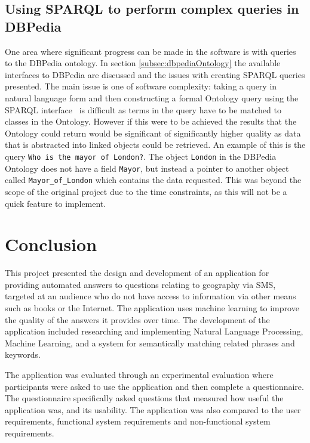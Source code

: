 \documentclass[authoryearcitations]{UoYCSproject}
\begin{document}
\section{Using SPARQL to perform complex queries in DBPedia}
\label{sec:evalSparql}
One area where significant progress can be made in the software is with queries to the DBPedia ontology. In section \ref{subsec:dbpediaOntology} the available interfaces to DBPedia are discussed and the issues with creating SPARQL queries presented. The main issue is one of software complexity: taking a query in natural language form and then constructing a formal Ontology query using the SPARQL interface~\cite{dbPediaSparql} is difficult as terms in the query have to be matched to classes in the Ontology. However if this were to be achieved the results that the Ontology could return would be significant of significantly higher quality as data that is abstracted into linked objects could be retrieved. An example of this is the query \texttt{Who is the mayor of London?}. The object \texttt{London} in the DBPedia Ontology does not have a field \texttt{Mayor}, but instead a pointer to another object called \texttt{Mayor\_of\_London} which contains the data requested. This was beyond the scope of the original project due to the time constraints, as this will not be a quick feature to implement.

\newpage

\chapter{Conclusion}
\label{sec:conclusion}
This project presented the design and development of an application for providing automated answers to questions relating to geography via SMS, targeted at an audience who do not have access to information via other means such as books or the Internet. The application uses machine learning to improve the quality of the answers it provides over time. The development of the application included researching and implementing Natural Language Processing, Machine Learning, and a system for semantically matching related phrases and keywords.

The application was evaluated through an experimental evaluation where participants were asked to use the application and then complete a questionnaire. The questionnaire specifically asked questions that measured how useful the application was, and its usability. The application was also compared to the user requirements, functional system requirements and non-functional system requirements.
\end{document}
